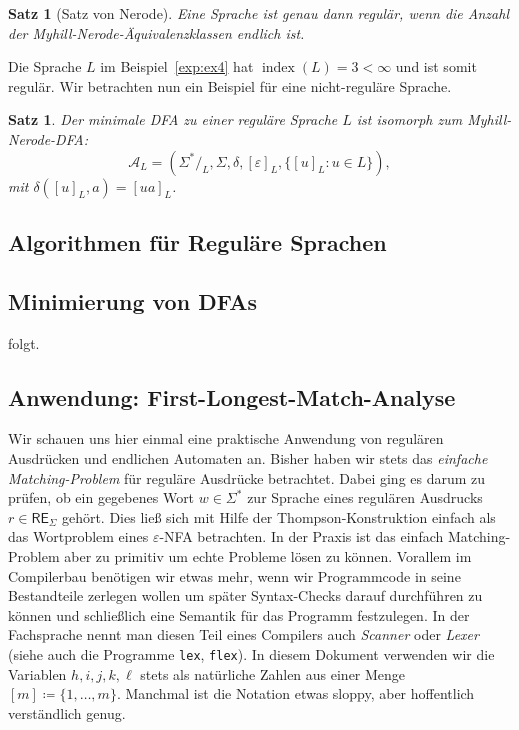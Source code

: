 \documentclass[11pt, a4paper]{article}
\theoremstyle{definition}
\theoremstyle{plain}
\newtheorem{theorem}[definition]{Satz}
\numberwithin{equation}{section}
\DeclareMathOperator{\ind}{index}
\begin{document}
\begin{theorem}[Satz von Nerode]\label{thm:nerode}
	Eine Sprache ist genau dann regulär, wenn die Anzahl der Myhill-Nerode-Äquivalenzklassen endlich ist.
\end{theorem}
Die Sprache $L$ im Beispiel~\ref{exp:ex4} hat $\ind(L) = 3 < \infty$ und ist somit regulär. Wir betrachten nun ein Beispiel für eine nicht-reguläre Sprache.
\begin{theorem}
	Der minimale DFA zu einer reguläre Sprache $L$ ist isomorph zum Myhill-Nerode-DFA:
	$$
		\mathcal{A}_L = (\Sigma^\ast/_L, \Sigma, \delta, [\varepsilon]_L, \{[u]_L : u \in L \}),
	$$
	mit $\delta([u]_L, a) = [ua]_L$.
\end{theorem}


\subsection{Algorithmen für Reguläre Sprachen}\label{sec:regular_algorithms}


\subsection{Minimierung von DFAs}\label{sec:regular_minimization}
folgt. %


\subsection{Anwendung: First-Longest-Match-Analyse}\label{sec:regular_first-longest-match}
Wir schauen uns hier einmal eine praktische Anwendung von regulären Ausdrücken und endlichen Automaten an. Bisher haben wir stets das \textit{einfache Matching-Problem} für reguläre Ausdrücke betrachtet. Dabei ging es darum zu prüfen, ob ein gegebenes Wort $w \in \Sigma^\ast$ zur Sprache eines regulären Ausdrucks $r \in \mathsf{RE}_\Sigma$ gehört. Dies ließ sich mit Hilfe der Thompson-Konstruktion einfach als das Wortproblem eines $\varepsilon$-NFA betrachten. In der Praxis ist das einfach Matching-Problem aber zu primitiv um echte Probleme lösen zu können. Vorallem im Compilerbau benötigen wir etwas mehr, wenn wir Programmcode in seine Bestandteile zerlegen wollen um später Syntax-Checks darauf durchführen zu können und schließlich eine Semantik für das Programm festzulegen. In der Fachsprache nennt man diesen Teil eines Compilers auch \textit{Scanner} oder \textit{Lexer} (siehe auch die Programme \texttt{lex}, \texttt{flex}).
In diesem Dokument verwenden wir die Variablen $h, i, j, k, \ell$ stets als natürliche Zahlen aus einer Menge $[m] \coloneqq \{ 1, \ldots, m \}$. Manchmal ist die Notation etwas sloppy, aber hoffentlich verständlich genug.
\end{document}
